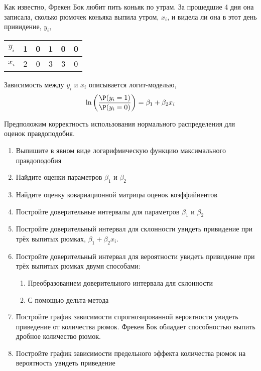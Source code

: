 \documentclass[pdftex,11pt,openany]{book}\usepackage[]{graphicx}\usepackage[]{color}
\begin{document}
\begin{problem}
Как известно, Фрекен Бок любит пить коньяк по утрам. За прошедшие 4 дня она записала, сколько рюмочек коньяка выпила утром, $x_i$, и видела ли она в этот день привидение, $y_i$, 

\begin{tabular}{c|ccccc}
$y_i$ & 1 & 0 & 1 & 0 & 0 \\
\hline
$x_i$ & 2 & 0 & 3 & 3 & 0 
\end{tabular}  

Зависимость между $y_i$ и $x_i$ описывается логит-моделью, 
\[
\ln 
\left(
  \frac{\P(y_i=1)}{\P(y_i=0)}
\right)
=\beta_1+\beta_2 x_i
\]

Предположим корректность использования нормального распределения для оценок правдоподобия.

\begin{enumerate}
\item Выпишите в явном виде логарифмическую функцию максимального правдоподобия
\item \useR Найдите оценки параметров $\beta_1$ и $\beta_2$
\item Найдите оценку ковариационной матрицы оценок коэффийиентов
\item Постройте доверительные интервалы для параметров $\beta_1$ и $\beta_2$
\item Постройте доверительный интервал для склонности увидеть привидение при трёх выпитых рюмках, $\beta_1 + \beta_2 x_i$.
\item Постройте доверительный интервал для вероятности увидеть привидение при трёх выпитых рюмках двумя способами:
\begin{enumerate}
\item Преобразованием доверительного интервала для склонности
\item С помощью дельта-метода
\end{enumerate}
\item Постройте график зависимости спрогнозированной вероятности увидеть приведение от количества рюмок. Фрекен Бок обладает способностью выпить дробное количество рюмок.
\item Постройте график зависимости предельного эффекта количества рюмок на вероятность увидеть приведение
\end{enumerate}
\end{problem}

\begin{solution}
\end{solution}
\end{document}

